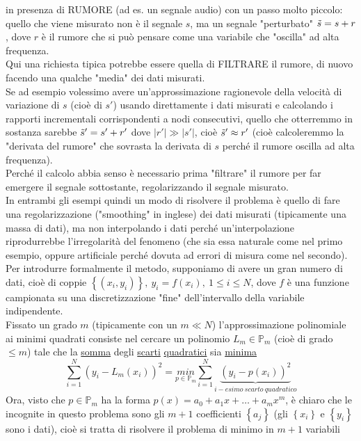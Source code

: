 \documentclass[12pt,a4paper]{article}
\begin{document}
in presenza di RUMORE (ad es. un segnale audio) con un passo molto piccolo: quello che viene misurato non è il segnale $s$, ma un segnale "perturbato" $\Tilde{s} = s+r$, dove $r$ è il rumore che si può pensare come una variabile che "oscilla" ad alta frequenza.\\
Qui una richiesta tipica potrebbe essere quella di FILTRARE il rumore, di nuovo facendo una qualche "media" dei dati misurati.\\
Se ad esempio volessimo avere un'approssimazione ragionevole della velocità di variazione di $s$ (cioè
di $s'$) usando direttamente i dati misurati e calcolando i rapporti incrementali corrispondenti a nodi consecutivi, quello che otterremmo in sostanza sarebbe $\Tilde{s}' = s' + r'$ dove $|r'| \gg |s'|$, cioè $\Tilde{s}' \approx r'$ (cioè calcoleremmo la "derivata del rumore" che sovrasta la derivata di $s$ perché il rumore oscilla ad alta frequenza). \\
Perché il calcolo abbia senso è necessario prima "filtrare" il rumore per far emergere il segnale sottostante, regolarizzando il segnale misurato. \\
In entrambi gli esempi quindi
un modo di risolvere il problema è quello di fare una regolarizzazione ("smoothing" in inglese) dei dati misurati (tipicamente una massa di dati), ma non interpolando i dati perché un'interpolazione riprodurrebbe l'irregolarità del fenomeno (che sia essa naturale come nel primo esempio, oppure artificiale perché dovuta ad errori di misura come nel secondo). \\
Per introdurre formalmente il metodo, supponiamo di avere un gran numero di dati, cioè di coppie $\left\{ (x_i,y_i) \right\}, \ y_i = f(x_i), \ 1 \leq i \leq N$,
dove $f$ è una funzione campionata su una discretizzazione "fine" dell'intervallo della variabile indipendente. \\
Fissato un grado $m$ (tipicamente con un $m \ll N$) l'approssimazione polinomiale ai minimi quadrati consiste nel cercare un polinomio $L_m \in \mathbb{P}_m$ (cioè di grado $\leq m$) tale che la \underline{somma} degli \underline{scarti} \underline{quadratici} sia \underline{minima}
\begin{equation*}
    \sum_{i=1}^N (y_i - L_m(x_i))^2 = \underset{p \in \mathbb{P}_m}{min} \sum_{i=1}^N \underbrace{(y_i - p(x_i))^2}_{i-esimo \ scarto \ quadratico}
\end{equation*}
Ora, visto che $p \in \mathbb{P}_m$ ha la forma
$p(x) = a_0 + a_1x + \dots + a_mx^m$, è chiaro che le incognite in questo problema sono gli $m+1$ coefficienti $\left\{ a_j \right\}$ (gli $\left\{ x_i \right\}$ e $\left\{ y_i \right\}$ sono i dati), cioè si tratta di risolvere il problema di minimo in $m+1$ variabili
\end{document}

